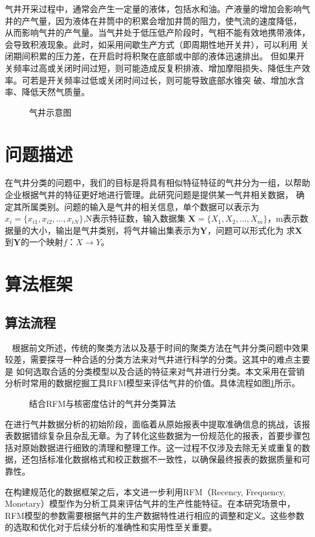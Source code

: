 气井开采过程中，通常会产生一定量的液体，包括水和油。产液量的增加会影响气井的产气量，因为液体在井筒中的积累会增加井筒的阻力，使气流的速度降低，
从而影响气井的产气量。当气井处于低压低产阶段时，气相不能有效地携带液体，会导致积液现象。此时，如采用间歇生产方式（即周期性地开关井），可以利用
关闭期间积累的压力差，在开启时将积聚在底部或中部的液体迅速排出。
但如果开关频率过高或关闭时间过短，则可能造成反复积排液、增加摩阻损失、降低生产效率。可若是开关频率过低或关闭时间过长，则可能导致底部水锥突
破、增加水含率、降低天然气质量。
\begin{figure}[H]
    \centering
    \caption{气井示意图}
\end{figure}
\section{问题描述}
在气井分类的问题中，我们的目标是将具有相似特征特征的气井分为一组，以帮助企业根据气井的特征更好地进行管理。此研究问题是提供某一气井相关数据，
确定其所属类别。问题的输入是气井的相关信息，单个数据可以表示为$x_i = \{x_{i1}, x_{i2}, \ldots, x_{iN}\}$,N表示特征数，输入数据集
$\mathbf{X} = \{X_{1}, X_{2}, \ldots, X_{m}\}$，m表示数据量的大小，输出是气井类别，将气井输出集表示为$\mathbf{Y}$，问题可以形式化为
求$\mathbf{X}$到$\mathbf{Y}$的一个映射$f$：$X \rightarrow Y$。
\section{算法框架}
\subsection{算法流程}\
\label{sec:K-Shapeprocess}
根据前文所述，传统的聚类方法以及基于时间的聚类方法在气井分类问题中效果较差，需要探寻一种合适的分类方法来对气井进行科学的分类。这其中的难点主要是
如何选取合适的分类模型以及合适的特征来对气井进行分类。本文采用在营销分析时常用的数据挖掘工具RFM模型来评估气井的价值。具体流程如图\ref{fig:wellcla}所示。
\begin{figure}
    \centering
    \caption{结合RFM与核密度估计的气井分类算法}
    \label{fig:wellcla}
\end{figure}
在进行气井数据分析的初始阶段，面临着从原始报表中提取准确信息的挑战，该报表数据错综复杂且杂乱无章。为了转化这些数据为一份规范化的报表，首要步骤包括对原始数据进行细致的清理和整理工作。这一过程不仅涉及去除无关或重复的数据，还包括标准化数据格式和校正数据不一致性，以确保最终报表的数据质量和可靠性。

在构建规范化的数据框架之后，本文进一步利用RFM（Recency, Frequency, Monetary）模型作为分析工具来评估气井的生产性能特征。在本研究场景中，RFM模型的参数需要根据气井的生产数据特性进行相应的调整和定义。这些参数的选取和优化对于后续分析的准确性和实用性至关重要。

